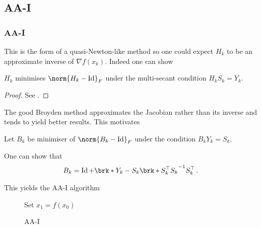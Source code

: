 \subsection{AA-I}
\begin{frame}
	\frametitle{AA-I}
	This is the form of a quasi-Newton-like method so one could expect $H_k$ to be an approximate inverse of $\nabla f(x_k)$. Indeed one can show
	\begin{proposition}
		$H_k$ minimises $\norm{H_k-\Id}_F$ under the multi-secant condition $H_kS_k=Y_k$.
	\end{proposition}
	\begin{proof}
		See \cite{ZhaAA}.
	\end{proof}
	The good Broyden method approximates the Jacobian rather than its inverse and tends to yield better results. This motivates
	\begin{definition}
		Let $B_k$ be minimiser of $\norm{B_k-\Id}_F$ under the condition $B_kY_k=S_k$.
	\end{definition}
	One can show that
	\begin{align*}
		B_k = \Id+\brk*{Y_k-S_k}\brk*{S_k^\top S_k}^{-1}S_k^\top\,.
	\end{align*}
\end{frame}

\begin{frame}
	This yields the AA-I algorithm
	\begin{figure}
	\begin{algorithm}[H]
	\caption{AA-I}
	\color{gray}
	\BlankLine
	Set $x_1=f(x_0)$
	
	\end{algorithm}
	\end{figure}
\end{frame}

